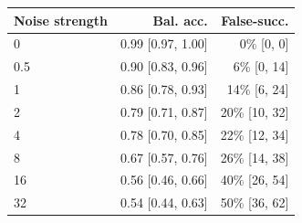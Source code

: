 \begin{tabular}{lrr}
\toprule
Noise strength & Bal. acc. & False-succ. \\
\midrule
0 & 0.99 [0.97, 1.00] & 0\% [0, 0] \\
0.5 & 0.90 [0.83, 0.96] & 6\% [0, 14] \\
1 & 0.86 [0.78, 0.93] & 14\% [6, 24] \\
2 & 0.79 [0.71, 0.87] & 20\% [10, 32] \\
4 & 0.78 [0.70, 0.85] & 22\% [12, 34] \\
8 & 0.67 [0.57, 0.76] & 26\% [14, 38] \\
16 & 0.56 [0.46, 0.66] & 40\% [26, 54] \\
32 & 0.54 [0.44, 0.63] & 50\% [36, 62] \\
\bottomrule
\end{tabular}